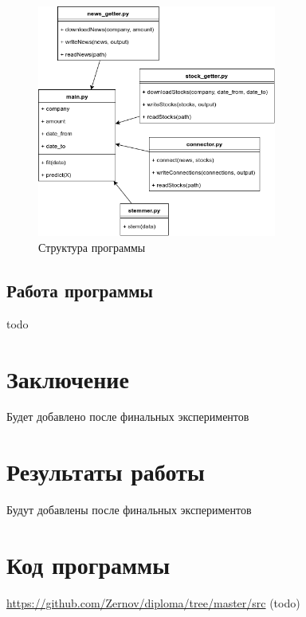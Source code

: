\documentclass[14pt]{matmex-diploma-custom}
\begin{document}
\begin{figure}[h]
\centering
\includegraphics[width=0.7\textwidth]{img/class}
\caption{Структура программы}
\label{img:class}
\end{figure}

\subsection{Работа программы}

todo

\clearpage\section*{Заключение}

Будет добавлено после финальных экспериментов

\setmonofont[Mapping=tex-text]{CMU Typewriter Text}



\begin{appendices}

\section{Результаты работы}

Будут добавлены после финальных экспериментов

\section{Код программы}

\url{https://github.com/Zernov/diploma/tree/master/src} (todo)

\end{appendices}
\end{document}
